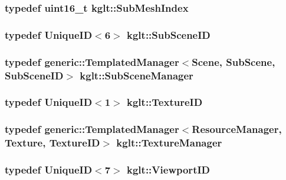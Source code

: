 \hypertarget{namespacekglt_aa750d1bb3b7a0d679b32c96fed625213}{
\subsubsection[{Sub\-Mesh\-Index}]{\setlength{\rightskip}{0pt plus 5cm}typedef uint16\-\_\-t {\bf kglt\-::\-Sub\-Mesh\-Index}}}\label{namespacekglt_aa750d1bb3b7a0d679b32c96fed625213}
\hypertarget{namespacekglt_a36b738e02745f47c81d1c9991fdc6237}{
\subsubsection[{Sub\-Scene\-I\-D}]{\setlength{\rightskip}{0pt plus 5cm}typedef {\bf Unique\-I\-D}$<$6$>$ {\bf kglt\-::\-Sub\-Scene\-I\-D}}}\label{namespacekglt_a36b738e02745f47c81d1c9991fdc6237}
\hypertarget{namespacekglt_a8531aaaf2d2242f192637125e1c40e5e}{
\subsubsection[{Sub\-Scene\-Manager}]{\setlength{\rightskip}{0pt plus 5cm}typedef {\bf generic\-::\-Templated\-Manager}$<${\bf Scene}, {\bf Sub\-Scene}, {\bf Sub\-Scene\-I\-D}$>$ {\bf kglt\-::\-Sub\-Scene\-Manager}}}\label{namespacekglt_a8531aaaf2d2242f192637125e1c40e5e}
\hypertarget{namespacekglt_aaea040f25edb7f75ca0f3aa8136a45a1}{
\subsubsection[{Texture\-I\-D}]{\setlength{\rightskip}{0pt plus 5cm}typedef {\bf Unique\-I\-D}$<$1$>$ {\bf kglt\-::\-Texture\-I\-D}}}\label{namespacekglt_aaea040f25edb7f75ca0f3aa8136a45a1}
\hypertarget{namespacekglt_a7fb916291048874ce18ede38682511c9}{
\subsubsection[{Texture\-Manager}]{\setlength{\rightskip}{0pt plus 5cm}typedef {\bf generic\-::\-Templated\-Manager}$<${\bf Resource\-Manager}, {\bf Texture}, {\bf Texture\-I\-D}$>$ {\bf kglt\-::\-Texture\-Manager}}}\label{namespacekglt_a7fb916291048874ce18ede38682511c9}
\hypertarget{namespacekglt_a24d24e429365d0832e56b0082d8e53a0}{
\subsubsection[{Viewport\-I\-D}]{\setlength{\rightskip}{0pt plus 5cm}typedef {\bf Unique\-I\-D}$<$7$>$ {\bf kglt\-::\-Viewport\-I\-D}}}\label{namespacekglt_a24d24e429365d0832e56b0082d8e53a0}


